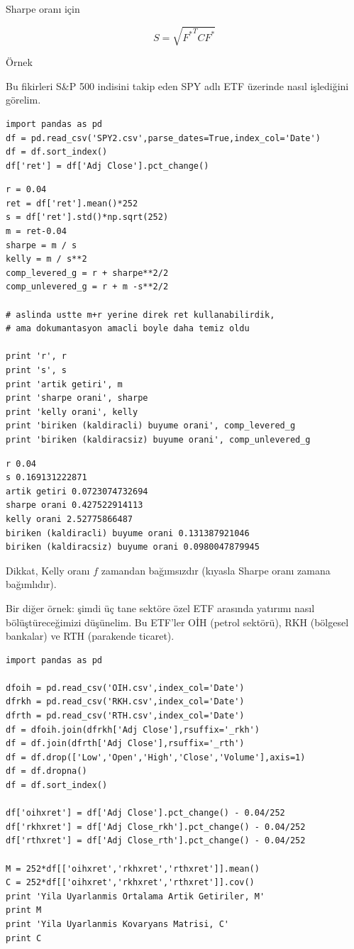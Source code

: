 \documentclass[12pt,fleqn]{article}\usepackage{../../common}
\begin{document}
Sharpe oranı için 

$$ S = \sqrt{{F^\ast}^TCF^\ast} $$

Örnek

Bu fikirleri S\&P 500 indisini takip eden SPY adlı ETF üzerinde nasıl
işlediğini görelim. 

\begin{verbatim}
import pandas as pd
df = pd.read_csv('SPY2.csv',parse_dates=True,index_col='Date')
df = df.sort_index()
df['ret'] = df['Adj Close'].pct_change()
\end{verbatim}

\begin{verbatim}
r = 0.04
ret = df['ret'].mean()*252
s = df['ret'].std()*np.sqrt(252)
m = ret-0.04
sharpe = m / s
kelly = m / s**2
comp_levered_g = r + sharpe**2/2
comp_unlevered_g = r + m -s**2/2

# aslinda ustte m+r yerine direk ret kullanabilirdik, 
# ama dokumantasyon amacli boyle daha temiz oldu

print 'r', r
print 's', s
print 'artik getiri', m
print 'sharpe orani', sharpe
print 'kelly orani', kelly
print 'biriken (kaldiracli) buyume orani', comp_levered_g
print 'biriken (kaldiracsiz) buyume orani', comp_unlevered_g
\end{verbatim}

\begin{verbatim}
r 0.04
s 0.169131222871
artik getiri 0.0723074732694
sharpe orani 0.427522914113
kelly orani 2.52775866487
biriken (kaldiracli) buyume orani 0.131387921046
biriken (kaldiracsiz) buyume orani 0.0980047879945
\end{verbatim}

Dikkat, Kelly oranı $f$ zamandan bağımsızdır (kıyasla Sharpe oranı zamana
bağımlıdır). 

Bir diğer örnek: şimdi üç tane sektöre özel ETF arasında yatırımı nasıl
bölüştüreceğimizi düşünelim. Bu ETF'ler OİH (petrol sektörü), RKH (bölgesel
bankalar) ve RTH (parakende ticaret). 

\begin{verbatim}
import pandas as pd

dfoih = pd.read_csv('OIH.csv',index_col='Date')
dfrkh = pd.read_csv('RKH.csv',index_col='Date')
dfrth = pd.read_csv('RTH.csv',index_col='Date')
df = dfoih.join(dfrkh['Adj Close'],rsuffix='_rkh')
df = df.join(dfrth['Adj Close'],rsuffix='_rth')
df = df.drop(['Low','Open','High','Close','Volume'],axis=1)
df = df.dropna()
df = df.sort_index()

df['oihxret'] = df['Adj Close'].pct_change() - 0.04/252
df['rkhxret'] = df['Adj Close_rkh'].pct_change() - 0.04/252
df['rthxret'] = df['Adj Close_rth'].pct_change() - 0.04/252

M = 252*df[['oihxret','rkhxret','rthxret']].mean()
C = 252*df[['oihxret','rkhxret','rthxret']].cov()
print 'Yila Uyarlanmis Ortalama Artik Getiriler, M'
print M
print 'Yila Uyarlanmis Kovaryans Matrisi, C'
print C
\end{verbatim}
\end{document}
